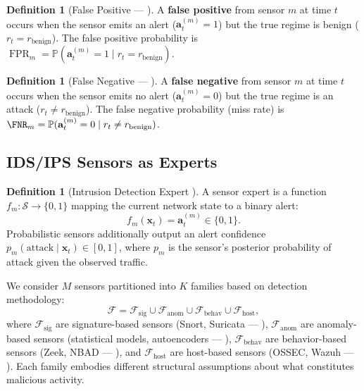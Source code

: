 \documentclass[11pt,a4paper]{article}
\theoremstyle{definition}
\newtheorem{definition}[theorem]{Definition}
\theoremstyle{remark}
\DeclareMathOperator{\FPR}{FPR}
\newcommand{\Pbb}{\mathbb{P}}
\newcommand{\cF}{\mathcal{F}}
\newcommand{\cS}{\mathcal{S}}
\newcommand{\attack}{\mathrm{attack}}
\newcommand{\sensorstate}{\mathbf{x}}
\newcommand{\alertvec}{\mathbf{a}}
\begin{document}
\begin{definition}[False Positive — ]
\label{def:false_positive}
A \textbf{false positive} from sensor $m$ at time $t$ occurs when the sensor emits an alert ($\alertvec_t^{(m)} = 1$) but the true regime is benign ($r_t = r_{\mathrm{benign}}$). The false positive probability is $\FPR_m = \Pbb(\alertvec_t^{(m)} = 1 \mid r_t = r_{\mathrm{benign}})$.
\end{definition}

\begin{definition}[False Negative — ]
\label{def:false_negative}
A \textbf{false negative} from sensor $m$ at time $t$ occurs when the sensor emits no alert ($\alertvec_t^{(m)} = 0$) but the true regime is an attack ($r_t \neq r_{\mathrm{benign}}$). The false negative probability (miss rate) is $\FNR_m = \Pbb(\alertvec_t^{(m)} = 0 \mid r_t \neq r_{\mathrm{benign}})$.
\end{definition}

\subsection{IDS/IPS Sensors as Experts }

\begin{definition}[Intrusion Detection Expert ]
\label{def:expert}
A sensor expert is a function $f_m: \cS \to \{0, 1\}$ mapping the current network state to a binary alert:
\begin{equation}
f_m(\sensorstate_t) = \alertvec_t^{(m)} \in \{0, 1\}.
\label{eq:alert}
\end{equation}
Probabilistic sensors additionally output an alert confidence $p_m(\attack \mid \sensorstate_t) \in [0, 1]$, where $p_m$ is the sensor's posterior probability of attack given the observed traffic.
\end{definition}

We consider $M$ sensors partitioned into $K$ families based on detection methodology:
\begin{equation}
\cF = \cF_{\mathrm{sig}} \cup \cF_{\mathrm{anom}} \cup \cF_{\mathrm{behav}} \cup \cF_{\mathrm{host}},
\label{eq:families}
\end{equation}
where $\cF_{\mathrm{sig}}$ are signature-based sensors (Snort, Suricata — ), $\cF_{\mathrm{anom}}$ are anomaly-based sensors (statistical models, autoencoders — ), $\cF_{\mathrm{behav}}$ are behavior-based sensors (Zeek, NBAD — ), and $\cF_{\mathrm{host}}$ are host-based sensors (OSSEC, Wazuh — ). Each family embodies different structural assumptions about what constitutes malicious activity.
\end{document}
